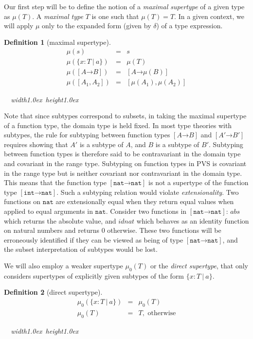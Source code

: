 \documentclass [12pt,twoside]{cslreport}
\newcommand{\thmbox}
   {{\ \hfill\hbox{%
      \vrule width1.0ex height1.0ex
   }\parfillskip 0pt }}
\newcommand{\aro}{\mathord\rightarrow} %
\newcommand{\funtype}[2]{[#1 \aro #2]}
\newcommand{\tupletype}[1]{[#1]}
\newcommand{\listwo}[2]{#1_{1}, #1_{2}}
\newcommand{\ttint}{\mathtt{int}}
\newcommand{\ttnat}{\mathtt{nat}}
\newcommand{\vbar}{\ |\ }
\newtheorem{definition}{Definition}
\newenvironment{Defn}[1]{\begin{definition}[#1]\label{defn:#1}}{
\thmbox\end{definition}}
\begin{document}
Our first step will be to define the notion of a \emph{maximal supertype}
of a given type as $\mu(T)$.  A \emph{maximal type} $T$ is one such that
$\mu(T) = T$.  In a given context, we will apply  $\mu$ only to the
expanded form (given by $\delta$) of a type expression.  
\begin{Defn}{maximal supertype}
\begin{eqnarray*}
  \mu(s) & = & s \\
   \mu(\{x : T \vbar a\}) & = & \mu(T) \\
%
   \mu(\funtype{A}{B}) & = & \funtype{A}{\mu(B)} \\
  \mu(\tupletype{\listwo{A}{n}}) & = & \tupletype{\mu(A_1), \mu(A_2)}
\end{eqnarray*}
\end{Defn}
Note that since subtypes correspond to subsets, in taking the maximal
supertype of a function type, the domain type is held fixed.  In most type
theories with subtypes, the rule for subtyping between function types
$\funtype{A}{B}$ and $\funtype{A'}{B'}$ requires showing that $A'$ is a
subtype of $A$, and $B$ is a subtype of $B'$\@.  Subtyping between
function types is therefore said to be contravariant in the domain type
and covariant in the range type.  Subtyping on function types in PVS is
covariant in the range type but is neither covariant nor contravariant in
the domain type.  This means that the function type
$\funtype{\ttnat}{\ttnat}$ is not a supertype of the function type
$\funtype{\ttint}{\ttnat}$\@.  Such a subtyping relation would violate
{\em extensionality\/}\@.  Two functions on $\ttnat$ are extensionally
equal when they return equal values when applied to equal arguments in
$\ttnat$\@.  Consider two functions in $\funtype{\ttnat}{\ttnat}$:
$\mathit{abs}$ which returns the absolute value, and $\mathit{idnat}$
which behaves as an identity function on natural numbers and returns $0$
otherwise.  These two functions will be erroneously identified if they can
be viewed as being of type $\funtype{\ttnat}{\ttnat}$, and the subset
interpretation of subtypes would be lost.

We will also employ a weaker supertype $\mu_0(T)$ or the
{\em direct supertype\/}, that only considers supertypes of
explicitly given subtypes of the form $\{x : T \vbar a\}$.
\begin{Defn}{direct supertype}
\begin{eqnarray*}
\mu_0(\{x : T \vbar a\}) & = & \mu_0(T)\\
\mu_0(T) & = & T, \mbox{ otherwise}
\end{eqnarray*}
\end{Defn}
\end{document}
